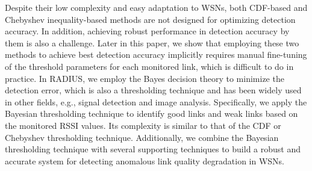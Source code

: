 Despite their low complexity and easy adaptation to WSNs, both CDF-based and Chebyshev inequality-based methods are not designed for optimizing detection accuracy. In addition, achieving robust performance in detection accuracy by them is also a challenge. Later in this paper, we show that employing these two methods to achieve best detection accuracy implicitly requires manual fine-tuning of the threshold parameters
for each monitored link, which is difficult to do in practice. In RADIUS, we employ the Bayes decision theory \cite{melsa1978decision} to minimize the detection error, which is also a thresholding technique and has been widely used in other fields, e.g., signal detection and image analysis. Specifically, we apply the Bayesian thresholding technique to identify good links and weak links based on the monitored RSSI values. Its complexity is similar to that of the CDF or Chebyshev thresholding technique. Additionally, we combine the Bayesian thresholding technique with several supporting techniques to build a robust and accurate system for detecting anomalous link quality degradation in WSNs. %

